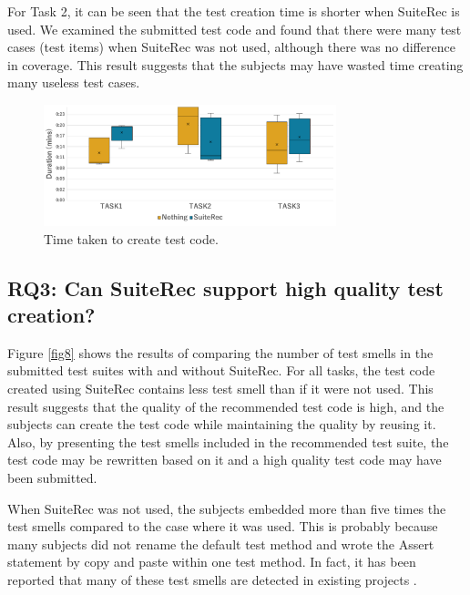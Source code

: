 \documentclass[conference]{IEEEtran}
\begin{document}
For Task 2, it can be seen that the test creation time is shorter when SuiteRec is used. We examined the submitted test code and found that there were many test cases (test items) when SuiteRec was not used, although there was no difference in coverage. This result suggests that the subjects may have wasted time creating many useless test cases.

\begin{figure}[htbp]
\centerline{\includegraphics[width=8.5cm]{duration.pdf}}
\caption{Time taken to create test code.}
\label{fig7}
\end{figure}

\subsection{RQ3: Can SuiteRec support high quality test creation?}
Figure \ref{fig8} shows the results of comparing the number of test smells in the submitted test suites with and without SuiteRec. For all tasks, the test code created using SuiteRec contains less test smell than if it were not used. This result suggests that the quality of the recommended test code is high, and the subjects can create the test code while maintaining the quality by reusing it. Also, by presenting the test smells included in the recommended test suite, the test code may be rewritten based on it and a high quality test code may have been submitted. 



When SuiteRec was not used, the subjects embedded more than five times the test smells compared to the case where it was used. This is probably because many subjects did not rename the default test method and wrote the Assert statement by copy and paste within one test method. In fact, it has been reported that many of these test smells are detected in existing projects \cite{b9}.
\end{document}
